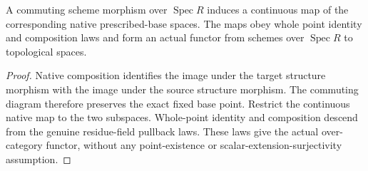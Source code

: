 \begin{theorem}
\label{scheme:relative-valued-point-functor}
\leanok
{}
A commuting scheme morphism over $\operatorname{Spec}R$ induces a continuous
map of the corresponding native prescribed-base spaces. The maps obey whole
point identity and composition laws and form an actual functor from schemes
over $\operatorname{Spec}R$ to topological spaces.
\end{theorem}
\begin{proof}
Native composition identifies the image under the target structure morphism
with the image under the source structure morphism. The commuting diagram
therefore preserves the exact fixed base point. Restrict the continuous native
map to the two subspaces. Whole-point identity and composition descend from
the genuine residue-field pullback laws. These laws give the actual over-category
functor, without any point-existence or scalar-extension-surjectivity assumption.
\end{proof}

